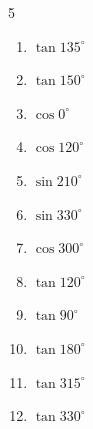 \begin{multicols}{5}
\begin{enumerate}

  \item $\displaystyle \tan{135^\circ}$

        \phantom{$\displaystyle =-1$}

  \item $\displaystyle \tan{150^\circ}$


  \item $\displaystyle \cos{0^\circ}$

        \phantom{$\displaystyle =1$}

  \item $\displaystyle \cos{120^\circ}$


  \item $\displaystyle \sin{210^\circ}$


  \item $\displaystyle \sin{330^\circ}$


  \item $\displaystyle \cos{300^\circ}$


  \item $\displaystyle \tan{120^\circ}$


  \item $\displaystyle \tan{90^\circ}$

        \phantom{$\displaystyle なし$}

  \item $\displaystyle \tan{180^\circ}$

        \phantom{$\displaystyle =0$}

  \item $\displaystyle \tan{315^\circ}$

        \phantom{$\displaystyle =-1$}

  \item $\displaystyle \tan{330^\circ}$


\columnbreak %


\end{enumerate}
\end{multicols}
